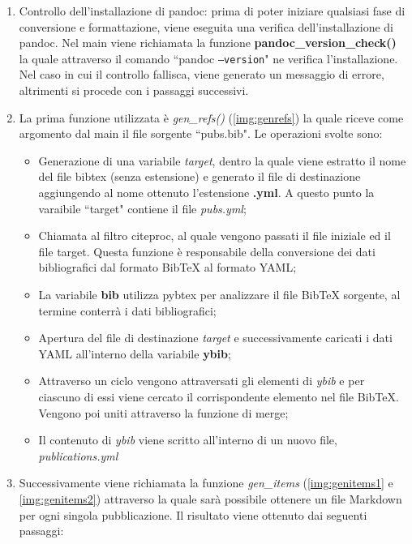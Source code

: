 \documentclass[target=bach,aauheader=]{thud}
\begin{document}
\begin{enumerate}
    \item Controllo dell'installazione di pandoc: prima di poter iniziare qualsiasi fase di conversione e formattazione, viene eseguita una verifica dell'installazione di pandoc. 
    \newline
    Nel main viene richiamata la funzione \textbf{pandoc\_version\_check()} la quale attraverso il comando ``pandoc \texttt{--version}" ne verifica l'installazione. 
    Nel caso in cui il controllo fallisca, viene generato un messaggio di errore, altrimenti si procede con i passaggi successivi.
    \item La prima funzione utilizzata è \textit{gen\_refs()} (\cref{img:genrefs}) la quale riceve come argomento dal main il file sorgente ``pubs.bib". Le operazioni svolte sono:
    \begin{itemize}
        \item Generazione di una variabile \textit{target}, dentro la quale viene estratto il nome del file bibtex (senza estensione) e generato il file di destinazione aggiungendo al nome ottenuto l'estensione \textbf{.yml}. A questo punto la varaibile ``target" contiene il file \textit{pubs.yml};
        \item Chiamata al filtro citeproc, al quale vengono passati il file iniziale ed il file target. Questa funzione è responsabile della conversione dei dati bibliografici dal formato BibTeX al formato YAML;
        \item La variabile \textbf{bib} utilizza pybtex per analizzare il file BibTeX sorgente, al termine conterrà i dati bibliografici;
        \item Apertura del file di destinazione \textit{target} e successivamente caricati i dati YAML all'interno della variabile \textbf{ybib};
        \item Attraverso un ciclo vengono attraversati gli elementi di \textit{ybib} e per ciascuno di essi viene cercato il corrispondente elemento nel file BibTeX. Vengono poi uniti attraverso la funzione di merge; 
        \item Il contenuto di \textit{ybib} viene scritto all'interno di un nuovo file, \textit{publications.yml} 
    \end{itemize}
    \item Successivamente viene richiamata la funzione \textit{gen\_items} (\cref{img:genitems1} e \cref{img:genitems2}) attraverso la quale sarà possibile ottenere un file Markdown per ogni singola pubblicazione. Il risultato viene ottenuto dai seguenti passaggi:

\end{enumerate}
\end{document}
